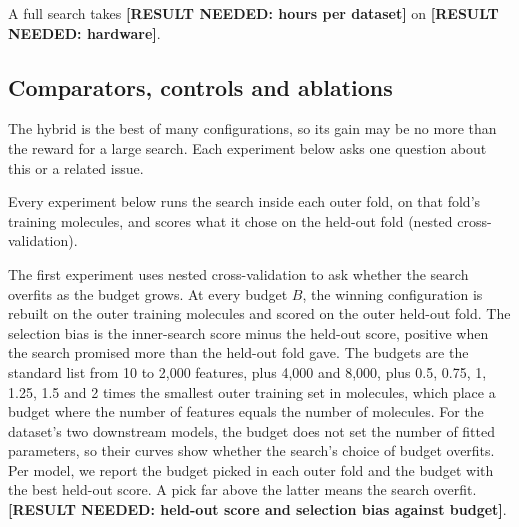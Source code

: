 A full search takes \textbf{[RESULT NEEDED: hours per dataset]} on \textbf{[RESULT NEEDED: hardware]}.


\subsection{Comparators, controls and ablations}\label{sec:method:comparators}

The hybrid is the best of many configurations, so its gain may be no more than the reward for a large search. Each experiment below asks one question about this or a related issue.

Every experiment below runs the search inside each outer fold, on that fold's training molecules, and scores what it chose on the held-out fold (nested cross-validation).

The first experiment uses nested cross-validation to ask whether the search overfits as the budget grows. At every budget $B$, the winning configuration is rebuilt on the outer training molecules and scored on the outer held-out fold. The selection bias is the inner-search score minus the held-out score, positive when the search promised more than the held-out fold gave. The budgets are the standard list from 10 to 2,000 features, plus 4,000 and 8,000, plus 0.5, 0.75, 1, 1.25, 1.5 and 2 times the smallest outer training set in molecules, which place a budget where the number of features equals the number of molecules. %
For the dataset's two downstream models, the budget does not set the number of fitted parameters, so their curves show whether the search's choice of budget overfits. Per model, we report the budget picked in each outer fold and the budget with the best held-out score. A pick far above the latter means the search overfit. \textbf{[RESULT NEEDED: held-out score and selection bias against budget]}.

